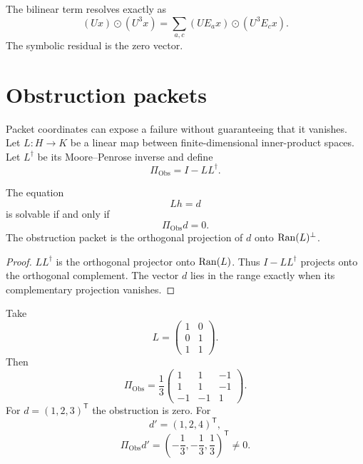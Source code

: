 The bilinear term resolves exactly as
\[
(Ux)\odot(U^3x)
=
\sum_{a,c}
(UE_ax)\odot(U^3E_cx).
\]
The symbolic residual is the zero vector.


\section{Obstruction packets}
Packet coordinates can expose a failure without guaranteeing that it vanishes.  Let $L:H\to K$ be a linear map between finite-dimensional inner-product spaces.  Let $L^\dagger$ be its Moore--Penrose inverse and define
\[
\Pi_{\mathrm{Obs}}=I-LL^\dagger.
\]

\begin{theorem}\label{thm:obstruction-criterion}
The equation
\[
Lh=d
\]
is solvable if and only if
\[
\boxed{\Pi_{\mathrm{Obs}}d=0.}
\]
The obstruction packet is the orthogonal projection of $d$ onto $\operatorname{Ran}(L)^\perp$.
\end{theorem}

\begin{proof}
$LL^\dagger$ is the orthogonal projector onto $\operatorname{Ran}(L)$.  Thus $I-LL^\dagger$ projects onto the orthogonal complement.  The vector $d$ lies in the range exactly when its complementary projection vanishes.
\end{proof}

Take
\[
L=
\begin{pmatrix}
1&0\\0&1\\1&1
\end{pmatrix}.
\]
Then
\[
\Pi_{\mathrm{Obs}}
=
\frac13
\begin{pmatrix}
1&1&-1\\
1&1&-1\\
-1&-1&1
\end{pmatrix}.
\]
For $d=(1,2,3)^{\mathsf T}$ the obstruction is zero.  For
\[
d'=(1,2,4)^{\mathsf T},
\]
\[
\boxed{
\Pi_{\mathrm{Obs}}d'
=
\left(-\frac13,-\frac13,\frac13\right)^{\mathsf T}\ne0.
}
\]


